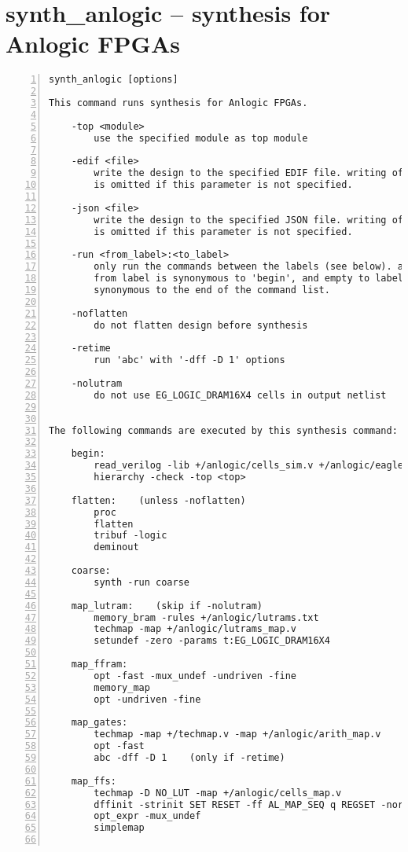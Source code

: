 \section{synth\_anlogic -- synthesis for Anlogic FPGAs}
\label{cmd:synth_anlogic}
\begin{lstlisting}[numbers=left,frame=single]
    synth_anlogic [options]

This command runs synthesis for Anlogic FPGAs.

    -top <module>
        use the specified module as top module

    -edif <file>
        write the design to the specified EDIF file. writing of an output file
        is omitted if this parameter is not specified.

    -json <file>
        write the design to the specified JSON file. writing of an output file
        is omitted if this parameter is not specified.

    -run <from_label>:<to_label>
        only run the commands between the labels (see below). an empty
        from label is synonymous to 'begin', and empty to label is
        synonymous to the end of the command list.

    -noflatten
        do not flatten design before synthesis

    -retime
        run 'abc' with '-dff -D 1' options

    -nolutram
        do not use EG_LOGIC_DRAM16X4 cells in output netlist


The following commands are executed by this synthesis command:

    begin:
        read_verilog -lib +/anlogic/cells_sim.v +/anlogic/eagle_bb.v
        hierarchy -check -top <top>

    flatten:    (unless -noflatten)
        proc
        flatten
        tribuf -logic
        deminout

    coarse:
        synth -run coarse

    map_lutram:    (skip if -nolutram)
        memory_bram -rules +/anlogic/lutrams.txt
        techmap -map +/anlogic/lutrams_map.v
        setundef -zero -params t:EG_LOGIC_DRAM16X4

    map_ffram:
        opt -fast -mux_undef -undriven -fine
        memory_map
        opt -undriven -fine

    map_gates:
        techmap -map +/techmap.v -map +/anlogic/arith_map.v
        opt -fast
        abc -dff -D 1    (only if -retime)

    map_ffs:
        techmap -D NO_LUT -map +/anlogic/cells_map.v
        dffinit -strinit SET RESET -ff AL_MAP_SEQ q REGSET -noreinit
        opt_expr -mux_undef
        simplemap


\end{lstlisting}
